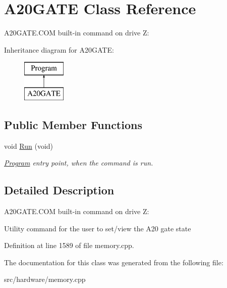 \hypertarget{classA20GATE}{\section{A20\-G\-A\-T\-E Class Reference}
\label{classA20GATE}
}


A20\-G\-A\-T\-E.\-C\-O\-M built-\/in command on drive Z\-:  


Inheritance diagram for A20\-G\-A\-T\-E\-:\begin{figure}[H]
\begin{center}
\leavevmode
\includegraphics[height=2.000000cm]{classA20GATE}
\end{center}
\end{figure}
\subsection*{Public Member Functions}
\begin{DoxyCompactItemize}
\item 
\hypertarget{classA20GATE_a7d53ddb7d6453f710b7e829b5c0f6ca3}{void \hyperlink{classA20GATE_a7d53ddb7d6453f710b7e829b5c0f6ca3}{Run} (void)}\label{classA20GATE_a7d53ddb7d6453f710b7e829b5c0f6ca3}

\begin{DoxyCompactList}\small\item\em \hyperlink{classProgram}{Program} entry point, when the command is run. \end{DoxyCompactList}\end{DoxyCompactItemize}


\subsection{Detailed Description}
A20\-G\-A\-T\-E.\-C\-O\-M built-\/in command on drive Z\-: 

Utility command for the user to set/view the A20 gate state 

Definition at line 1589 of file memory.\-cpp.



The documentation for this class was generated from the following file\-:\begin{DoxyCompactItemize}
\item 
src/hardware/memory.\-cpp\end{DoxyCompactItemize}
